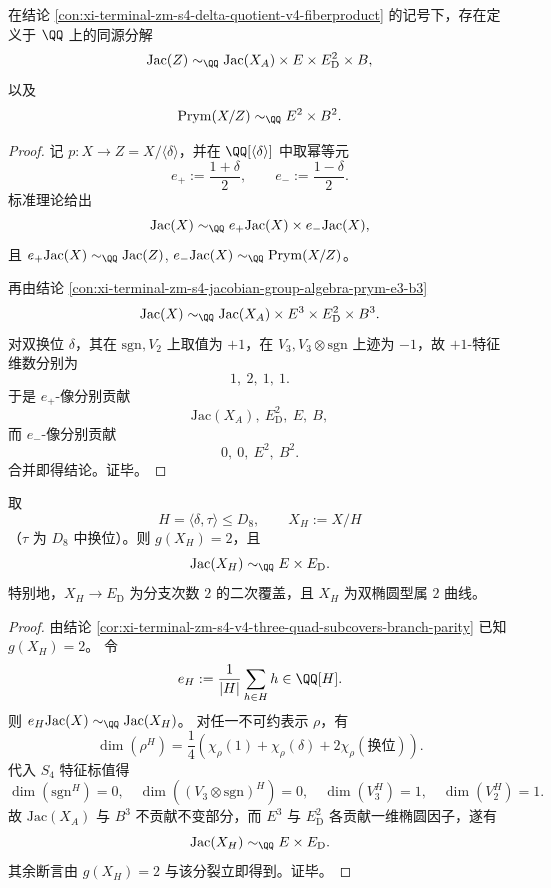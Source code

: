 \begin{conclusion}\label{con:xi-terminal-zm-s4-delta-eigensplitting-jacz-prymxz}
在结论 \ref{con:xi-terminal-zm-s4-delta-quotient-v4-fiberproduct} 的记号下，存在定义于 \(\QQ\) 上的同源分解
\[
\mathrm{Jac}(Z)\sim_{\QQ}\mathrm{Jac}(X_A)\times E\times E_{\mathrm D}^2\times B,
\]
以及
\[
\mathrm{Prym}(X/Z)\sim_{\QQ}E^2\times B^2.
\]
\end{conclusion}
\begin{proof}
记 \(p:X\to Z=X/\langle\delta\rangle\)，并在 \(\QQ[\langle\delta\rangle]\) 中取幂等元
\[
e_+:=\frac{1+\delta}{2},\qquad e_-:=\frac{1-\delta}{2}.
\]
标准理论给出
\[
\mathrm{Jac}(X)\sim_{\QQ}e_+\mathrm{Jac}(X)\times e_-\mathrm{Jac}(X),
\]
且
\(
e_+\mathrm{Jac}(X)\sim_{\QQ}\mathrm{Jac}(Z)
\),
\(
e_-\mathrm{Jac}(X)\sim_{\QQ}\mathrm{Prym}(X/Z)
\)。

再由结论 \ref{con:xi-terminal-zm-s4-jacobian-group-algebra-prym-e3-b3}
\[
\mathrm{Jac}(X)\sim_{\QQ}\mathrm{Jac}(X_A)\times E^3\times E_{\mathrm D}^2\times B^3.
\]
对双换位 \(\delta\)，其在 \(\mathrm{sgn},V_2\) 上取值为 \(+1\)，在 \(V_3,V_3\otimes\mathrm{sgn}\) 上迹为 \(-1\)，故 \(+1\)-特征维数分别为
\[
1,\ 2,\ 1,\ 1.
\]
于是 \(e_+\)-像分别贡献
\[
\mathrm{Jac}(X_A),\ E_{\mathrm D}^2,\ E,\ B,
\]
而 \(e_-\)-像分别贡献
\[
0,\ 0,\ E^2,\ B^2.
\]
合并即得结论。证毕。
\end{proof}

\begin{conclusion}\label{con:xi-terminal-zm-s4-xh-jacobian-splitting-ed-e}
取
\[
H=\langle\delta,\tau\rangle\le D_8,\qquad X_H:=X/H
\]
（\(\tau\) 为 \(D_8\) 中换位）。则 \(g(X_H)=2\)，且
\[
\mathrm{Jac}(X_H)\sim_{\QQ}E\times E_{\mathrm D}.
\]
特别地，\(X_H\to E_{\mathrm D}\) 为分支次数 \(2\) 的二次覆盖，且 \(X_H\) 为双椭圆型属 \(2\) 曲线。
\end{conclusion}
\begin{proof}
由结论 \ref{cor:xi-terminal-zm-s4-v4-three-quad-subcovers-branch-parity} 已知 \(g(X_H)=2\)。
令
\[
e_H:=\frac{1}{|H|}\sum_{h\in H}h\in\QQ[H].
\]
则 \(e_H\mathrm{Jac}(X)\sim_{\QQ}\mathrm{Jac}(X_H)\)。
对任一不可约表示 \(\rho\)，有
\[
\dim(\rho^H)=\frac14\!\left(\chi_\rho(1)+\chi_\rho(\delta)+2\chi_\rho(\text{换位})\right).
\]
代入 \(S_4\) 特征标值得
\[
\dim(\mathrm{sgn}^H)=0,\quad
\dim((V_3\otimes\mathrm{sgn})^H)=0,\quad
\dim(V_3^H)=1,\quad
\dim(V_2^H)=1.
\]
故 \(\mathrm{Jac}(X_A)\) 与 \(B^3\) 不贡献不变部分，而 \(E^3\) 与 \(E_{\mathrm D}^2\) 各贡献一维椭圆因子，遂有
\[
\mathrm{Jac}(X_H)\sim_{\QQ}E\times E_{\mathrm D}.
\]
其余断言由 \(g(X_H)=2\) 与该分裂立即得到。证毕。
\end{proof}

